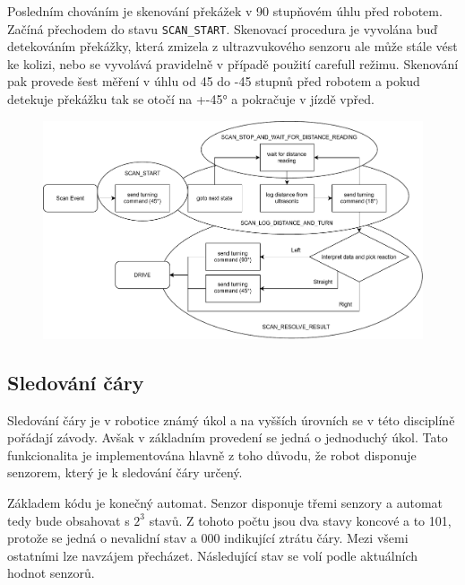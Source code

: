 Posledním chováním je skenování překážek v 90 stupňovém úhlu před robotem. Začíná přechodem do stavu \verb|SCAN_START|. Skenovací procedura je vyvolána buď detekováním překážky, která zmizela z ultrazvukového senzoru ale může stále vést ke kolizi, nebo se vyvolává pravidelně v případě použití carefull režimu. Skenování pak provede šest měření v úhlu od 45 do -45 stupnů před robotem a pokud detekuje překážku tak se otočí na +-45° a pokračuje v jízdě vpřed.

\begin{figure}[h!]
	\centering
	\includegraphics[scale=0.75]{obrazky-figures/wandering_scan_diagram.pdf}
	\caption{}
	\label{}
\end{figure}

\subsection*{Sledování čáry}
Sledování čáry je v robotice známý úkol a na vyšších úrovních se v této disciplíně pořádají závody. Avšak v základním provedení se jedná o jednoduchý úkol. Tato funkcionalita je implementována hlavně z toho důvodu, že robot disponuje senzorem, který je k sledování čáry určený.

Základem kódu je konečný automat. Senzor disponuje třemi senzory a automat tedy bude obsahovat s $2^3$ stavů. Z tohoto počtu jsou dva stavy koncové a to 101, protože se jedná o nevalidní stav a 000 indikující ztrátu čáry. Mezi všemi ostatními lze navzájem přecházet. Následující stav se volí podle aktuálních hodnot senzorů.


